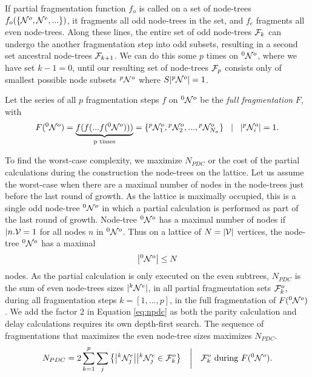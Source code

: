 If partial fragmentation function $f_o$ is called on a set of node-trees $f_o(\{\mathcal{N}^o, \mathcal{N}^e, ...\})$, it fragments all odd node-trees in the set, and $f_e$ fragments all even node-trees. Along these lines, the entire set of odd node-trees $\mathcal{F}_k$ can undergo the another fragmentation step into odd subsets, resulting in a second set ancestral node-trees $\mathcal{F}_{k+1}$. We can do this some $p$ times on ${}^{0}\mathcal{N}^o$, where we have set $k-1=0$, until our resulting set of node-trees $\mathcal{F}_{p}$ consists only of smallest possible node subsets ${}^{p}\mathcal{N}^o$ where $S|{}^{p}\mathcal{N}^o|=1$. 

\begin{definition}\label{def:fullfrag}
  Let the series of all $p$ fragmentation steps $f$ on ${}^{0}\mathcal{N}^o$ be the \emph{full fragmentation} $F$, with
  \begin{equation}\label{eq:fullfrag}
    F({}^{0}\mathcal{N}^o) = \underbrace{f(f(...f({}^{0}\mathcal{N}^o)))}_\text{p times} = \{{}^{p}\mathcal{N}^{o}_1, {}^{p}\mathcal{N}^{o}_2,...,{}^{p}\mathcal{N}^{o}_{N_\sigma} \} \hspace{.3cm} | \hspace{.3cm} \abs{{}^{p}\mathcal{N}^{o}_i} = 1.
  \end{equation}
\end{definition}

To find the worst-case complexity, we maximize $N_{PDC}$ or the cost of the partial calculations during the construction the node-trees on the lattice. Let us assume the worst-case when there are a maximal number of nodes in the node-trees just before the last round of growth. As the lattice is maximally occupied, this is a single odd node-tree ${}^{0}\mathcal{N}^o$ in which a partial calculation is performed as part of the last round of growth. Node-tree ${}^{0}\mathcal{N}^o$ has a maximal number of nodes if $|n.\mathcal{V}=1$ for all nodes $n$ in ${}^{0}\mathcal{N}^o$. Thus on a lattice of $N=|\mathcal{V}|$ vertices, the node-tree ${}^{0}\mathcal{N}^o$ has a maximal 
\begin{equation}\label{eq:limitnsetsize}
  \abs{{}^{0}\mathcal{N}^o} \leq N
\end{equation}
nodes. As the partial calculation is only executed on the even subtrees, $N_{PDC}$ is the sum of even node-trees sizes $|{}^{k}\mathcal{N}^e|$, in all partial fragmentation sets $\mathcal{F}^o_{k}$, during all fragmentation steps $k=[1,...,p]$, in the full fragmentation of $F({}^{0}\mathcal{N}^o)$. We add the factor 2 in Equation \eqref{eq:npdc} as both the parity calculation and delay calculations requires its own depth-first search. The sequence of fragmentations that maximizes the even node-tree sizes maximizes $N_{PDC}$.
\begin{equation}\label{eq:npdc}
  N_{PDC} = 2\sum_{k=1}^{p}{ \sum_j{ \left\{ \abs{{}^{k}\mathcal{N}_j^e} \big| {}^{k}\mathcal{N}_j^e \in \mathcal{F}^o_k \right\} } }
  \hspace{1em} \bigg| \hspace{1em} \mathcal{F}_k^o \text{ during } F({}^{0}\mathcal{N}^o).
\end{equation}

